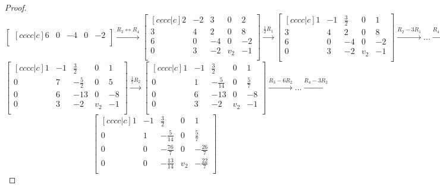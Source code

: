 \documentclass[12pt,oneside]{amsart}
\numberwithin{equation}{section}
\numberwithin{figure}{section}
\theoremstyle{plain}
\theoremstyle{definition}
\begin{document}
\begin{proof}
\[\begin{bmatrix}[cccc|c]
    6 & 0  & -4 & 0   & -2 \\
    \end{bmatrix} \overset{R_3 \leftrightarrow R_4}{\longrightarrow} \begin{bmatrix}[cccc|c]
    2 & -2 & 3  & 0   & 2  \\
    3 & 4  & 2  & 0   & 8  \\
    6 & 0  & -4 & 0   & -2 \\
    0 & 3  & -2 & v_2 & -1 \\
    \end{bmatrix} \overset{\frac{1}{2}R_1}{\longrightarrow} \begin{bmatrix}[cccc|c]
    1 & -1 & \frac{3}{2} & 0   & 1  \\
    3 & 4  & 2           & 0   & 8  \\
    6 & 0  & -4          & 0   & -2 \\
    0 & 3  & -2          & v_2 & -1 \\
  \end{bmatrix} \overset{R_2 - 3R_1}{\longrightarrow} ... \overset{R_4 - 6R_1}{\longrightarrow}\] 
  \[\begin{bmatrix}[cccc|c]
    1 & -1 & \frac{3}{2}  & 0   & 1  \\
    0 & 7  & -\frac{5}{2} & 0   & 5  \\
    0 & 6  & -13          & 0   & -8 \\
    0 & 3  & -2           & v_2 & -1 \\
    \end{bmatrix} \overset{\frac{1}{7}R_2}{\longrightarrow} \begin{bmatrix}[cccc|c]
    1 & -1 & \frac{3}{2}   & 0   & 1            \\
    0 & 1  & -\frac{5}{14} & 0   & \frac{5}{7}  \\
    0 & 6  & -13           & 0   & -8           \\
    0 & 3  & -2            & v_2 & -1           \\
  \end{bmatrix} \overset{R_3 - 6R_2}{\longrightarrow} ... \overset{R_4 - 3R_2}{\longrightarrow}\]
  \[\begin{bmatrix}[cccc|c]
    1 & -1 & \frac{3}{2}    & 0   & 1             \\
    0 & 1  & -\frac{5}{14}  & 0   & \frac{5}{7}   \\
    0 & 0  & -\frac{76}{7}  & 0   & -\frac{26}{7} \\
    0 & 0  & -\frac{13}{14} & v_2 & -\frac{22}{7} \\

\end{bmatrix}\]
\end{proof}
\end{document}

